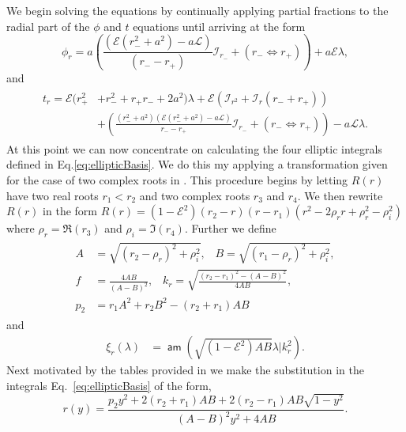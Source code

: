 \documentclass[12pt, amsmath]{revtex4-2}
\newcommand\lam{\lambda}
\newcommand\EN{\mathcal{E}}
\newcommand\ANG{\mathcal{L}}
\DeclareMathOperator{\am}{\mathsf{am}}
\begin{document}
We begin solving the equations by continually applying partial fractions to the radial part of the $\phi$ and $t$ equations until arriving at the form
\begin{equation}\label{eq:reducedformphi }
        \phi_r = a\left( \frac{(\EN(r_-^2+ a^2) - a \ANG)}{(r_{-}-r_{+})} \mathcal{I}_{r_{-}} + (r_{-} \Longleftrightarrow r_{+})\right) + a \EN \lam,
\end{equation}
and
\begin{align}\label{eq:reducedformt}
\begin{aligned}
    t_{r} = \EN(r_{+}^2&+r_{-}^2 + r_{+}r_{-}+2a^2)\lam + \EN\left(\mathcal{I}_{r^2} +  \mathcal{I}_{r}(r_{-} +r_{+})\right)\\
    &+\left(\frac{(r_{-}^2+a^2)(\EN(r_-^2+ a^2) - a \ANG)}{r_{-}-r_{+}}\mathcal{I}_{r_{-}} + (r_{-} \Longleftrightarrow r_{+})\right)-a \ANG \lam.
\end{aligned}
\end{align}
At this point we can now concentrate on calculating the four elliptic integrals defined in Eq.\eqref{eq:ellipticBasis}. We do this my applying a transformation given for the case of two complex roots in \cite{LabanMutrie}. This procedure begins by letting $R(r)$ have two real roots $r_1 < r_2$ and two complex roots $r_3$ and $r_4$. We then rewrite $R(r)$ in the form $R(r) = (1-\EN^2)(r_2-r)(r-r_1)(r^2 - 2\rho_rr + \rho_r^2 -\rho_i^2) $ where  $\rho_r=\Re(r_3)$ and $\rho_i=\Im(r_4)$. Further we define
\begin{align}
    \begin{aligned}
A &= \sqrt{(r_2-\rho_r)^2+\rho_i^2} , \;\;\;B = \sqrt{(r_1-\rho_r)^2+\rho_i^2} ,\\ 
f &= \frac{4 A B}{(A-B)^2},\;\;\;k_r = \sqrt{\frac{(r_2-r_1)^2 - (A-B)^2}{4 A B }}, \;\;\; \\
p_2 &= r_1A^2+r_2B^2-(r_2+r_1)AB
    \end{aligned}
\end{align}
and 
\begin{align}
        \xi_r(\lam) &= \am(\sqrt{ (1-\EN^2) A B} \lam|k_r^2).\label{eq:xiR}
\end{align}
 Next motivated by the tables provided in \cite{LabanMutrie} we make the substitution in the integrals Eq.~\eqref{eq:ellipticBasis} of the form, 
\begin{equation}\label{eq:transformation}
    r(y) = \frac{p_2y^2+2(r_2+r_1)AB+2(r_2-r_1)AB\sqrt{1-y^2}}{(A-B)^2y^2+4AB}.
\end{equation}
\end{document}
